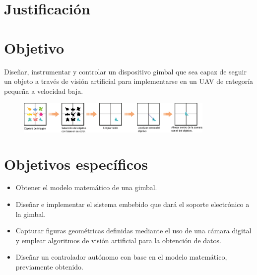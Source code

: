 \section{Justificación}


\section{Objetivo}
Diseñar, instrumentar y controlar un dispositivo gimbal que sea capaz de seguir un objeto a través de visión artificial para
implementarse en un UAV de categoría pequeña a velocidad baja.
\begin{figure}[htb]
	\centering
	\includegraphics[width=0.85\textwidth]{Contenido/Cuerpo/Capitulo1/Fig0.eps}
	\label{fig:Introduccion:Fig1}
\end{figure}

\section{Objetivos específicos}
\begin{itemize}
	\item Obtener el modelo matemático de una gimbal.
	\item Diseñar e implementar el sistema embebido que dará el soporte electrónico a la gimbal.
	\item Capturar figuras geométricas definidas  mediante el uso de una cámara digital y emplear algoritmos de visión artificial para la obtención de datos.
	\item Diseñar un controlador autónomo con base en el modelo matemático, previamente obtenido.
\end{itemize}

